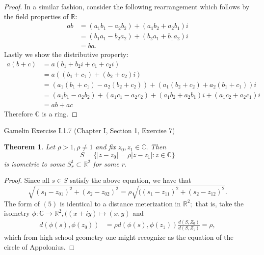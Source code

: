 \documentclass[letter]{article}
\newtheorem{theorem}{Theorem}
\newenvironment{menumerate}{%
  \edef\backupindent{\the\parindent}%
  \enumerate%
  \setlength{\parindent}{\backupindent}%
}{\endenumerate}
\begin{document}
\begin{menumerate}
\begin{proof}
        In a similar fashion, consider the following rearrangement which follows by the field 
        properties of $\mathbb{R}$:
        \begin{equation}
            \begin{aligned}
                ab &= (a_1b_1 - a_2b_2) + (a_1b_2 +a_2b_1)i \\
                &= (b_1a_1 - b_2a_2) + (b_2a_1 + b_1a_2)i \\
                &= ba.          
            \end{aligned}
        \end{equation}
        Lastly we show the distributive property: 
        \begin{equation}
            \begin{aligned}
                a(b+c) &= a(b_1+b_2i + c_1 + c_2i) \\
                &= a((b_1+c_1) + (b_2+c_2)i) \\
                &= (a_1(b_1+c_1) - a_2(b_2+c_2)) + (a_1(b_2+c_2) + a_2(b_1+c_1))i \\
                &= (a_1b_1 - a_2b_2)  + (a_1c_1 - a_2c_2) + (a_1b_2 + a_2b_1 )i + (a_1c_2 + a_2c_1)i   \\         
                &= ab + ac
            \end{aligned}
        \end{equation}
        Therefore $\mathbb{C}$ is a ring.
    \end{proof}


    \item Gamelin Exercise I.1.7 (Chapter I, Section 1, Exercise 7)  
    \begin{theorem}
        Let $\rho >1, \rho \neq 1$ and fix $z_0, z_1 \in \mathbb{C}.$ Then 
        $$S = \{|z-z_0| = \rho |z-z_1| : z \in \mathbb{C}\}$$ 
        is isometric to some $S^1_r \subset \mathbb{R}^2$ for some $r.$
    \end{theorem}
    \begin{proof}
        Since all $s \in S$ satisfy the above equation, we have that 
        \begin{equation}
            \sqrt{(s_1 - z_{01})^2 + (s_2 - z_{02})^2} = 
            \rho\sqrt{((s_1 - z_{11})^2 + (s_2 - z_{12})^2}.   
        \end{equation}
        The form of $(5)$ is identical to a distance meterization in $\mathbb{R}^2;$
        that is, take the isometry $\phi : \mathbb{C} \to \mathbb{R}^2, ((x + iy) \mapsto (x,y)$ and
        \begin{equation}
            \begin{aligned}
                d(\phi(s),\phi(z_0)) &= \rho d(\phi(s), \phi(z_1))
                    \frac{d(S,Z_0)}{d(S,Z_1)} = \rho,
            \end{aligned}
        \end{equation}
        which from high school geometry one might recognize as the equation of the circle
        of Appolonius. 
    \end{proof}


\end{menumerate}
\end{document}
